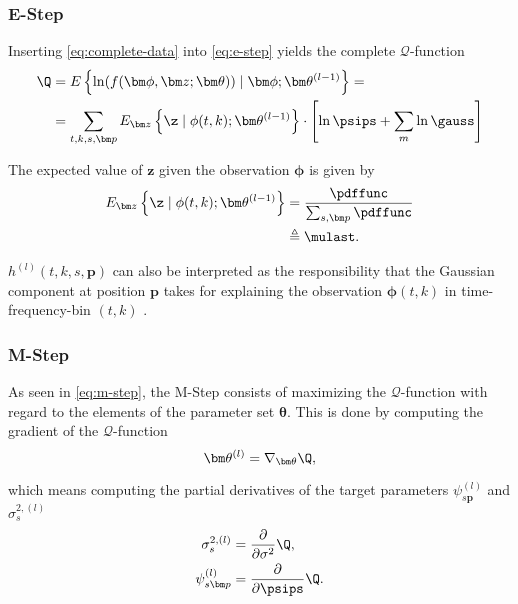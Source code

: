 \subsubsection*{E-Step}
Inserting \eqref{eq:complete-data} into \eqref{eq:e-step} yields the complete $\mathcal{Q}$-function
\begin{align}
    \Q &=E\left\{\ln(f(\bm\phi,\bm z;\bm\theta))\mid \bm\phi;\bm\theta^{(l-1)}\right\}=\\
       &=\sum_{t,k,s,\bm p}E_{\bm z}\left\{\z\mid\phi(t,k);\bm\theta^{(l-1)}\right\}\cdot\left [ \ln\psips+\sum_{m}\ln\gauss\right]\nonumber\\
\end{align}

The expected value of $\bm z$ given the observation $\bm\phi$ is given by
\begin{align}
\label{eq:responsibility}
    E_{\bm z}\left\{\z\mid\phi(t,k);\bm\theta^{(l-1)}\right\}&=\frac{\pdffunc}{\sum_{s,\bm p}\pdffunc}\\                  
                                                  &\triangleq\mulast .
\end{align}

$h^{(l)}(t,k,s,\bm p)$ can also be interpreted as the responsibility that the Gaussian component at position $\bm p$ takes for explaining the observation $\bm\phi(t,k)$ in time-frequency-bin $(t,k)$ \cite[p.~432]{Bishop2006}.

\subsubsection*{M-Step}
As seen in \eqref{eq:m-step}, the M-Step consists of maximizing the $\mathcal{Q}$-function with regard to the elements of the parameter set $\bm\theta$. This is done by computing the gradient of the $\mathcal{Q}$-function
\begin{equation}
\label{eq:m_step_theta_derivative}
    \bm\theta^{(l)}=\nabla_{\bm\theta}\Q,
\end{equation}

which means computing the partial derivatives of the target parameters $\psi_{s\bm p}^{(l)}$ and $\sigma_s^{2,(l)}$
\begin{align}
    \label{eq:m_step_sigma_derivative}
    \sigma_{s}^{2, (l)}&=\frac{\partial}{\partial \sigma^2}\Q,\\
    \label{eq:m_step_psi_derivative}
    \psi_{s\bm p}^{(l)}&=\frac{\partial}{\partial \psips}\Q.
\end{align}

